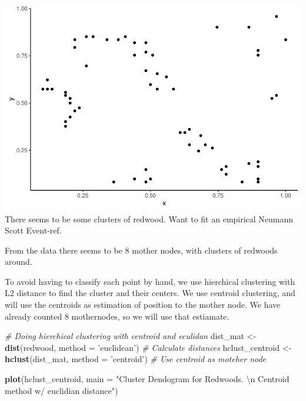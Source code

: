 \documentclass[
]{article}
\newenvironment{Shaded}{\begin{snugshade}}{\end{snugshade}}
\newcommand{\CharTok}[1]{\textcolor[rgb]{0.31,0.60,0.02}{#1}}
\newcommand{\CommentTok}[1]{\textcolor[rgb]{0.56,0.35,0.01}{\textit{#1}}}
\newcommand{\DataTypeTok}[1]{\textcolor[rgb]{0.13,0.29,0.53}{#1}}
\newcommand{\KeywordTok}[1]{\textcolor[rgb]{0.13,0.29,0.53}{\textbf{#1}}}
\newcommand{\NormalTok}[1]{#1}
\newcommand{\StringTok}[1]{\textcolor[rgb]{0.31,0.60,0.02}{#1}}
\begin{document}
\includegraphics{project2_files/figure-latex/unnamed-chunk-1-1.pdf}
There seems to be some clusters of redwood. Want to fit an empirical
Neumann Scott Event-ref.

From the data there seems to be 8 mother nodes, with clusters of
redwoods around.

To avoid having to classify each point by hand, we use hierchical
clustering with L2 distance to find the cluster and their centers. We
use centroid clustering, and will use the centroids as estimation of
position to the mother node. We have already counted 8 mothernodes, so
we will use that estiamate.

\begin{Shaded}
\begin{Highlighting}[]
\CommentTok{# Doing hierchical clustering with centroid and eculidan}
\NormalTok{dist_mat <-}\StringTok{ }\KeywordTok{dist}\NormalTok{(redwood, }\DataTypeTok{method =} \StringTok{'euclidean'}\NormalTok{) }\CommentTok{# Calculate distances}
\NormalTok{hclust_centroid <-}\StringTok{ }\KeywordTok{hclust}\NormalTok{(dist_mat, }\DataTypeTok{method =} \StringTok{'centroid'}\NormalTok{) }\CommentTok{# Use centroid as moteher node}
\end{Highlighting}
\end{Shaded}

\begin{Shaded}
\begin{Highlighting}[]
\KeywordTok{plot}\NormalTok{(hclust_centroid, }\DataTypeTok{main =} \StringTok{"Cluster Dendogram for Redwoods. }\CharTok{\textbackslash{}n}\StringTok{ Centroid method w/ euclidian distance"}\NormalTok{)}
\end{Highlighting}
\end{Shaded}
\end{document}
